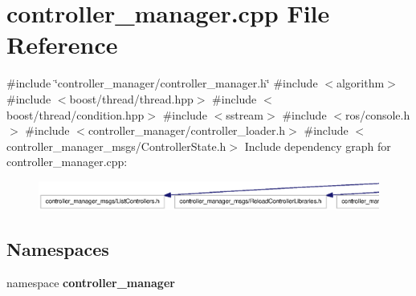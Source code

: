 \section{controller\-\_\-manager.\-cpp \-File \-Reference}
\label{controller__manager_8cpp}
{\ttfamily \#include \char`\"{}controller\-\_\-manager/controller\-\_\-manager.\-h\char`\"{}}\*
{\ttfamily \#include $<$algorithm$>$}\*
{\ttfamily \#include $<$boost/thread/thread.\-hpp$>$}\*
{\ttfamily \#include $<$boost/thread/condition.\-hpp$>$}\*
{\ttfamily \#include $<$sstream$>$}\*
{\ttfamily \#include $<$ros/console.\-h$>$}\*
{\ttfamily \#include $<$controller\-\_\-manager/controller\-\_\-loader.\-h$>$}\*
{\ttfamily \#include $<$controller\-\_\-manager\-\_\-msgs/\-Controller\-State.\-h$>$}\*
\-Include dependency graph for controller\-\_\-manager.\-cpp\-:\nopagebreak
\begin{figure}[H]
\begin{center}
\leavevmode
\includegraphics[width=350pt]{controller__manager_8cpp__incl}
\end{center}
\end{figure}
\subsection*{\-Namespaces}
\begin{DoxyCompactItemize}
\item 
namespace {\bf controller\-\_\-manager}
\end{DoxyCompactItemize}
